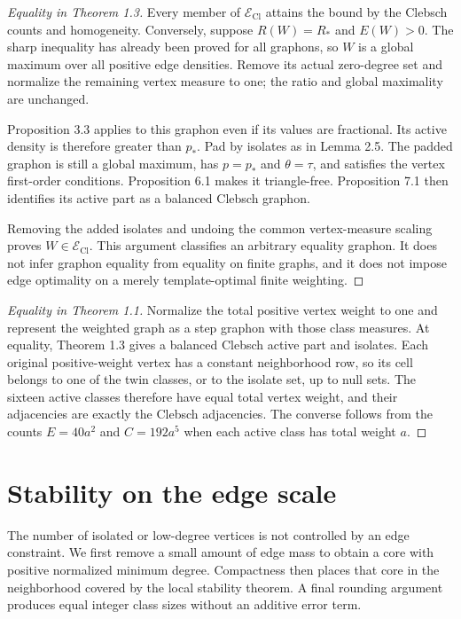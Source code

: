 \documentclass[11pt]{amsart}
\theoremstyle{definition}
\theoremstyle{remark}
\begin{document}
\begin{proof}[Equality in Theorem 1.3]
Every member of $\mathcal E_{\mathrm{Cl}}$ attains the bound by the Clebsch
counts and homogeneity. Conversely, suppose $R(W)=R_\ast$ and $E(W)>0$.
The sharp inequality has already been proved for all graphons, so $W$ is
a global maximum over all positive edge densities. Remove its actual
zero-degree set and normalize the remaining vertex measure to one; the
ratio and global maximality are unchanged.

Proposition 3.3 applies to this graphon even if its values are fractional.
Its active density is therefore greater than $p_\ast$. Pad by isolates as
in Lemma 2.5. The padded graphon is still a global maximum, has
$p=p_\ast$ and $\theta=\tau$, and satisfies the vertex first-order
conditions. Proposition 6.1 makes it triangle-free. Proposition 7.1 then
identifies its active part as a balanced Clebsch graphon.

Removing the added isolates and undoing the common vertex-measure scaling
proves $W\in\mathcal E_{\mathrm{Cl}}$. This argument classifies an arbitrary
equality graphon. It does not infer graphon equality from equality on finite
graphs, and it does not impose edge optimality on a merely template-optimal
finite weighting.
\end{proof}

\begin{proof}[Equality in Theorem 1.1]
Normalize the total positive vertex weight to one and represent the weighted
graph as a step graphon with those class measures. At equality, Theorem 1.3
gives a balanced Clebsch active part and isolates. Each original
positive-weight vertex has a constant neighborhood row, so its cell belongs
to one of the twin classes, or to the isolate set, up to null sets. The
sixteen active classes therefore have equal total vertex weight, and their
adjacencies are exactly the Clebsch adjacencies. The converse follows from
the counts $E=40a^2$ and $C=192a^5$ when each active class has total weight
$a$.
\end{proof}

\section{Stability on the edge scale}
\label{sec:stability}

The number of isolated or low-degree vertices is not controlled by an edge
constraint. We first remove a small amount of edge mass to obtain a core
with positive normalized minimum degree. Compactness then places that core
in the neighborhood covered by the local stability theorem. A final
rounding argument produces equal integer class sizes without an additive
error term.
\end{document}
